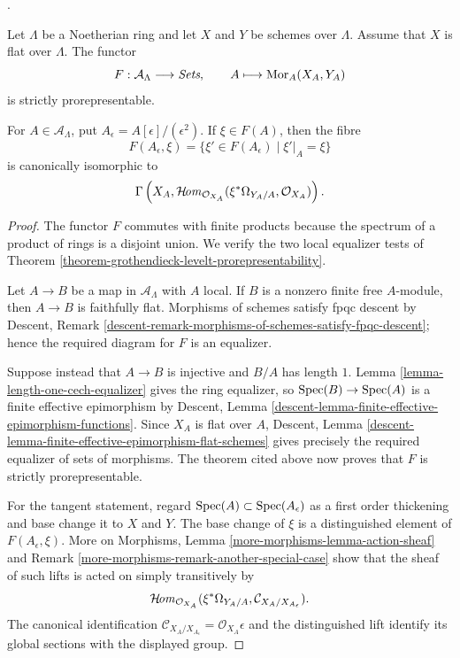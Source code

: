 \begin{proposition}
\label{proposition-formal-hom-prorepresentable-tangent}
\begin{reference}
\cite[Expos\'e 195, C, Proposition 2.1, p. 382]{FGA}.
\end{reference}
Let $\Lambda$ be a Noetherian ring and let $X$ and $Y$ be schemes over
$\Lambda$. Assume that $X$ is flat over $\Lambda$. The functor
$$
F : \mathcal{A}_\Lambda \longrightarrow \textit{Sets}, \qquad
A \longmapsto \mathop{\mathrm{Mor}}\nolimits_A(X_A, Y_A)
$$
is strictly prorepresentable.

For $A \in \mathcal{A}_\Lambda$, put
$A_\epsilon = A[\epsilon]/(\epsilon^2)$. If $\xi \in F(A)$, then the fibre
$$
F(A_\epsilon, \xi) =
\{\xi' \in F(A_\epsilon) \mid \xi'|_A = \xi\}
$$
is canonically isomorphic to
$$
\Gamma\left(X_A,
\mathop{\mathcal{H}\!\mathit{om}}\nolimits_{\mathcal{O}_{X_A}}
(\xi^*\Omega_{Y_A/A}, \mathcal{O}_{X_A})\right).
$$
\end{proposition}

\begin{proof}
The functor $F$ commutes with finite products because the spectrum of a
product of rings is a disjoint union. We verify the two local equalizer tests
of Theorem \ref{theorem-grothendieck-levelt-prorepresentability}.

Let $A \to B$ be a map in $\mathcal{A}_\Lambda$ with $A$ local. If $B$ is a
nonzero finite free $A$-module, then $A \to B$ is faithfully flat. Morphisms
of schemes satisfy fpqc descent by Descent, Remark
\ref{descent-remark-morphisms-of-schemes-satisfy-fpqc-descent}; hence the
required diagram for $F$ is an equalizer.

Suppose instead that $A \to B$ is injective and $B/A$ has length $1$.
Lemma \ref{lemma-length-one-cech-equalizer} gives the ring equalizer, so
$\mathop{\mathrm{Spec}}(B) \to \mathop{\mathrm{Spec}}(A)$ is a finite effective epimorphism by Descent, Lemma
\ref{descent-lemma-finite-effective-epimorphism-functions}. Since $X_A$ is
flat over $A$, Descent, Lemma
\ref{descent-lemma-finite-effective-epimorphism-flat-schemes} gives precisely
the required equalizer of sets of morphisms. The theorem cited above now
proves that $F$ is strictly prorepresentable.

For the tangent statement, regard
$\mathop{\mathrm{Spec}}(A) \subset \mathop{\mathrm{Spec}}(A_\epsilon)$ as a first order thickening and base
change it to $X$ and $Y$. The base change of $\xi$ is a distinguished element
of $F(A_\epsilon, \xi)$. More on Morphisms, Lemma
\ref{more-morphisms-lemma-action-sheaf} and Remark
\ref{more-morphisms-remark-another-special-case} show that the sheaf of such
lifts is acted on simply transitively by
$$
\mathop{\mathcal{H}\!\mathit{om}}\nolimits_{\mathcal{O}_{X_A}}
(\xi^*\Omega_{Y_A/A},
\mathcal{C}_{X_A/X_{A_\epsilon}}).
$$
The canonical identification
$\mathcal{C}_{X_A/X_{A_\epsilon}} = \mathcal{O}_{X_A}\epsilon$ and the
distinguished lift identify its global sections with the displayed group.
\end{proof}

